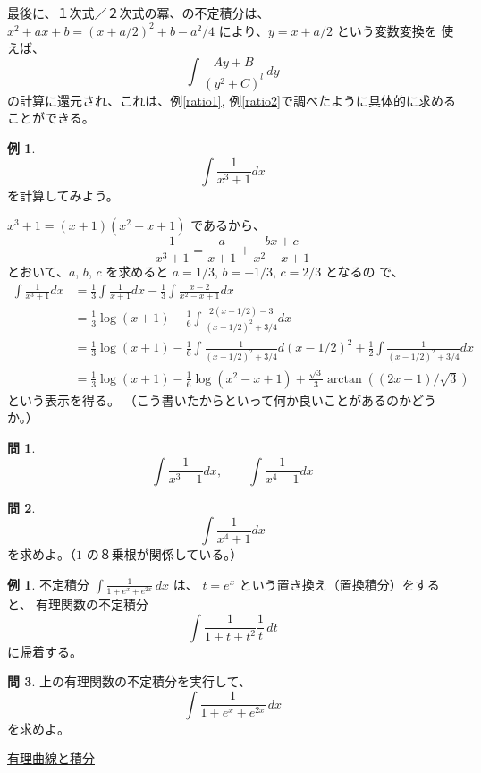 \documentclass[a4paper]{jsarticle}
\theoremstyle{definition}
\newtheorem{Example}[Theorem]{例}
\newtheorem{Exercise}{問}%
\theoremstyle{remark}
\begin{document}
最後に、１次式／２次式の冪、の不定積分は、
$x^2+ax+b = (x+a/2)^2 + b - a^2/4$ により、$y= x +a/2$ という変数変換を
使えば、
\[
\int \frac{Ay+B}{(y^2 +C)^l}\,dy 
\]
の計算に還元され、これは、例\ref{ratio1}, 例\ref{ratio2}で調べたように具体的に求めることができる。

\begin{Example}
\[
\int \frac{1}{x^3 + 1}dx
\]
を計算してみよう。

$x^3+1 = (x+1)(x^2-x+1)$ であるから、
\[
\frac{1}{x^3+1} = \frac{a}{x+1} + \frac{bx+c}{x^2-x+1}
\]
とおいて、$a$, $b$, $c$ を求めると $a=1/3$, $b=-1/3$, $c=2/3$ となるの
で、
\begin{align*}
\int \frac{1}{x^3+1}dx
&= \frac{1}{3} \int \frac{1}{x+1}dx -
\frac{1}{3} \int \frac{x-2}{x^2-x+1} dx\\
&= \frac{1}{3} \log (x+1)
- \frac{1}{6} \int \frac{2(x-1/2) -3}{(x-1/2)^2 + 3/4} dx\\
&= \frac{1}{3} \log(x+1)
- \frac{1}{6} \int \frac{1}{(x-1/2)^2 + 3/4} d(x-1/2)^2
+ \frac{1}{2} \int \frac{1}{(x-1/2)^2+3/4} dx \\
&= \frac{1}{3} \log(x+1)
- \frac{1}{6} \log(x^2-x+1)
+ \frac{\sqrt{3}}{3} \arctan((2x-1)/\sqrt{3})
\end{align*}
という表示を得る。
（こう書いたからといって何か良いことがあるのかどうか。）
\end{Example}

\begin{Exercise}
\[
\int \frac{1}{x^3 - 1}dx,
\qquad
\int \frac{1}{x^4 - 1}dx
\]
\end{Exercise}


\begin{Exercise}
\[
\int \frac{1}{x^4 + 1}dx
\]
を求めよ。（$1$ の８乗根が関係している。）
\end{Exercise}

\begin{Example}
不定積分
$\displaystyle \int \frac{1}{1 + e^x + e^{2x}}\,dx$ は、
$t = e^x$ という置き換え（置換積分）をすると、
有理関数の不定積分
\[
\int \frac{1}{1+t+t^2} \frac{1}{t}\, dt
\]
に帰着する。
\end{Example}

\begin{Exercise}
上の有理関数の不定積分を実行して、
\[
\int \frac{1}{1+e^x + e^{2x}}\, dx
\]
を求めよ。
\end{Exercise}

\bigskip
\noindent
\underline{有理曲線と積分} 
\end{document}
